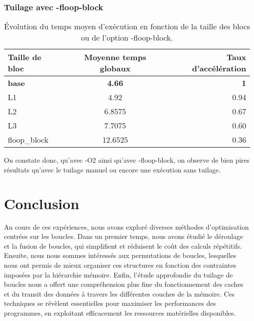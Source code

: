 \documentclass{rapport}
\begin{document}
\subsubsection*{Tuilage avec -floop-block}
\begin{table}[H]
  \centering
  \begin{tabular}{ l|c|r }
    Taille de bloc & Moyenne temps globaux & Taux d'accélération \\
    \hline
    \textbf{base} & \textbf{ 4.66 } & \textbf{1} \\
    L1 & 4.92 & 0.94 \\
    L2 & 6.8575 & 0.67 \\
    L3 & 7.7075 & 0.60 \\
    floop\_block & 12.6525 & 0.36 \\
  \end{tabular}
  \caption{Évolution du temps moyen d'exécution en fonction de la taille des blocs ou de l'option -floop-block.}
\end{table}

On constate donc, qu'avec -O2 ainsi qu'avec -floop-block, on observe de bien pires résultats qu'avec le tuilage manuel ou encore une exécution sans tuilage.

\section{Conclusion}
Au cours de ces expériences, nous avons exploré diverses méthodes d'optimisation centrées sur les boucles. Dans un premier temps, nous avons étudié le déroulage et la fusion de boucles, qui simplifient et réduisent le coût des calculs répétitifs. Ensuite, nous nous sommes intéressés aux permutations de boucles, lesquelles nous ont permis de mieux organiser ces structures en fonction des contraintes imposées par la hiérarchie mémoire. 
\newline
Enfin, l’étude approfondie du tuilage de boucles nous a offert une compréhension plus fine du fonctionnement des caches et du transit des données à travers les différentes couches de la mémoire. Ces techniques se révèlent essentielles pour maximiser les performances des programmes, en exploitant efficacement les ressources matérielles disponibles.
\end{document}
